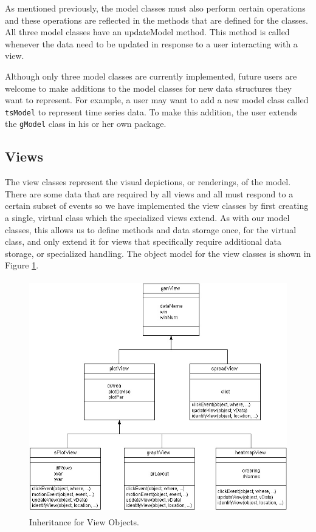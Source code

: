 \documentclass{article}[11pt]
\newcommand{\Rfunction}[1]{{\textsf{#1}}}
\newcommand{\Rclass}[1]{\texttt{#1}}
\begin{document}
As mentioned previously, the model classes must also perform certain
operations and these operations are reflected in the methods that are
defined for the classes.  All three model classes have an
\Rfunction{updateModel} method.  This method is called whenever the
data need to be updated in response to a user interacting with a view.

Although only three model classes are currently implemented, future
users are welcome to make additions to the model classes for new data
structures they want to represent.  For example, a user may want to add a new
model class called \Rclass{tsModel} to represent time series data.
To make this addition, the user extends the \Rclass{gModel} class in his or
her own package. 

\subsection{Views}\label{Ssec:OneViews}

The view classes represent the visual depictions, or renderings, of
the model.  There are some data that are required by all views and all
must respond to a certain subset of events so we have implemented the view
classes by first creating a single, virtual class which the specialized
views extend.  As with our model classes, this allows us to define
methods and data storage once, for the virtual class, and only extend
it for views that specifically require additional data storage, or
specialized handling.  The object model for the view classes is shown
in Figure \ref{Fig:View}.

\begin{figure}[ht]
  \begin{center}
    \includegraphics[height=4in, width=5in]{newViewClass.jpg}
    \caption{ Inheritance for View Objects. }
    \label{Fig:View}
  \end{center}
\end{figure}
\end{document}

